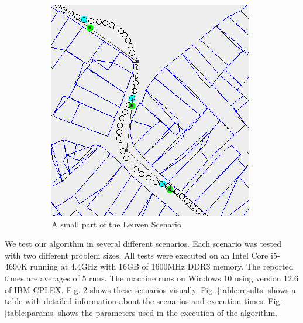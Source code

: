 \begin{figure}
\begin{subfigure}[t]{0.38\columnwidth}
        		\includegraphics[width=\textwidth]{img/leuven_zoom}
        		\caption{A small part of the Leuven Scenario}
        		\label{fig:scen-leuven}
	\end{subfigure}
        
    \caption{}\label{fig:scenarios}
\end{figure}
We test our algorithm in several different scenarios. Each scenario was tested with two different problem sizes. All tests were executed on an Intel Core i5-4690K running at 4.4GHz with 16GB of 1600MHz DDR3 memory. The reported times are averages of 5 runs. The machine runs on Windows 10 using version 12.6 of IBM CPLEX. Fig. \ref{fig:scenarios} shows these scenarios visually. Fig. \ref{table:results} shows a table with detailed information about the scenarios and execution times. Fig. \ref{table:params} shows the parameters used in the execution of the algorithm.

